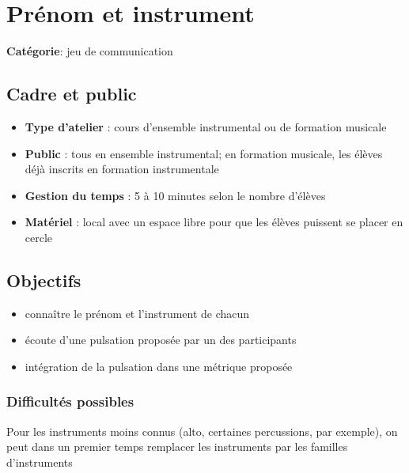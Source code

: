 \documentclass[a4paper,11pt,bibliography=totoc,numbers=noenddot,listof=flat,DIV=11,BCOR=0mm]{scrreprt}%
\begin{document}
\chapter[Jeu de communication: Prénom et instrument]{Prénom et instrument}


{\large \textbf{Catégorie}}:
jeu de communication

\section*{Cadre et public}
\begin{itemize}
\item [\textbullet]\textbf{Type d'atelier} : cours d'ensemble instrumental ou de formation musicale

\item [\textbullet]\textbf{Public} : tous en ensemble instrumental; en formation musicale, les élèves déjà inscrits en formation instrumentale

\item [\textbullet]\textbf{Gestion du temps} : 5 à 10 minutes selon le nombre d'élèves

\item [\textbullet]\textbf{Matériel} : local avec un espace libre pour que les élèves puissent se placer en cercle
\end{itemize}

\section*{Objectifs}
\begin{itemize}
\item connaître le prénom et l'instrument de chacun
\item écoute d'une pulsation proposée par un des participants
\item intégration de la pulsation dans une métrique proposée
\end{itemize}

\subsection*{Difficultés possibles}
Pour les instruments moins connus (alto, certaines percussions, par exemple), on peut dans un premier temps remplacer les instruments par les familles d'instruments
\end{document}
